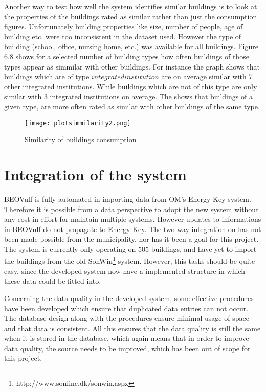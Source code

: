 Another way to test how well the system identifies similar buildings is to look at the properties of the buildings rated as similar rather than just the consumption figures. Unfortunately building properties like size, number of people, age of building etc. were too inconsistent in the dataset used. However the type of building (school, office, nursing home, etc.) was available for all buildings. Figure 6.8 shows for a selected number of building types how often buildings of those types appear as simmilar with other buildings. For instance the graph shows that buildings which are of type $integrated institution$ are on average similar with 7 other integrated institutions. While buildings which are not of this type are only similar with 3 integrated institutions on average. The shows that buildings of a given type, are more often rated as similar with other buildings of the same type.
\begin{figure}
\begin{center}
\texttt{[image: plotsimmilarity2.png]}
\end{center}
\caption{Similarity of buildings consumption}
\end{figure}
\section*{Integration of the system}
BEOVulf is fully automated in importing data from OM’s Energy Key system. Therefore it is possible from a data perspective to adopt the new system without any cost in effort for maintain multiple systems. However updates to informations in BEOVulf do not propagate to Energy Key. The two way integration on has not been made possible from the municipality, nor has it been a goal for this project. The system is currently only operating on 505 buildings, and have yet to import the buildings from the old SonWin\footnote{http://www.sonlinc.dk/sonwin.aspx} system. However, this tasks should be quite easy, since the developed system now have a implemented structure in which these data could be fitted into. 

Concerning the data quality in the developed system, some effective procedures have been developed which ensure that duplicated data entries can not occur. The database design along with the procedures ensure minimal usage of space and that data is consistent. All this ensures that the data quality is still the same when it is stored in the database, which again means that in order to improve data quality, the source needs to be improved, which has been out of scope for this project.
